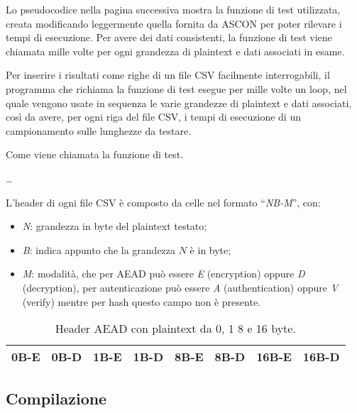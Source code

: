 Lo pseudocodice nella pagina successiva mostra la funzione di test utilizzata, creata modificando leggermente quella fornita da ASCON per poter rilevare i tempi di esecuzione. Per avere dei dati consistenti, la funzione di test viene chiamata mille volte per ogni grandezza di plaintext e dati associati in esame.

\noindent Per inserire i risultati come righe di un file CSV facilmente interrogabili, il programma che richiama la funzione di test esegue per mille volte un loop, nel quale vengono usate in sequenza le varie grandezze di plaintext e dati associati, così da avere, per ogni riga del file CSV, i tempi di esecuzione di un campionamento sulle lunghezze da testare.

\begin{algorithm}
    \caption{Come viene chiamata la funzione di test.}
    \begin{algorithmic}[1]
            \State {}
            \State \dots
            \State {}
			\State {}
        \EndFor
    \end{algorithmic}
\end{algorithm}

\noindent L'header di ogni file CSV è composto da celle nel formato ``\textit{NB-M}'', con:
\begin{itemize}
    \item \textit{N}: grandezza in byte del plaintext testato;
    \item \textit{B}: indica appunto che la grandezza $N$ è in byte;
    \item \textit{M}: modalità, che per AEAD può essere \textit{E} (encryption) oppure \textit{D} (decryption), per autenticazione può essere \textit{A} (authentication) oppure \textit{V} (verify) mentre per hash questo campo non è presente.
\end{itemize}

\begin{table}[H]
    \centering
	\begin{tabular}{|c|c|c|c|c|c|c|c|}
		\hline
		0B-E & 0B-D & 1B-E & 1B-D & 8B-E & 8B-D & 16B-E & 16B-D \\
		\hline
    \end{tabular}
    \caption{Header AEAD con plaintext da 0, 1 8 e 16 byte.}
\end{table}

\subsection{Compilazione}

